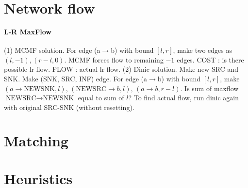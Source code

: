 \section{Network flow}

	\paragraph{L-R MaxFlow} (1) MCMF solution. For edge (a$\to$b) with bound $[l, r]$, make two edges as $(l, -1), (r-l ,0)$. MCMF forces flow to remaining $-1$ edges. COST : is there possible lr-flow. FLOW : actual lr-flow. (2) Dinic solution. Make new SRC and SNK. Make (SNK, SRC, INF) edge. For edge (a$\to$b) with bound $[l, r]$, make $(a \to \text{NEWSNK}, l)$, $(\text{NEWSRC} \to b, l)$, $(a\to b, r-l)$. Is sum of maxflow $\text{NEWSRC} \to \text{NEWSNK}$ equal to sum of $l$? To find actual flow, run dinic again with original SRC-SNK (without resetting).

\section{Matching}

\section{Heuristics}
